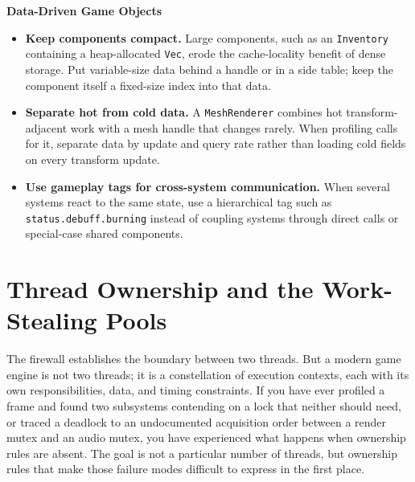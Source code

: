 \documentclass[
  11pt,
  letterpaper,
  DIV=11,
  numbers=noendperiod,
  twoside,
  open=right]{scrreprt}
\providecommand{\tightlist}{%
  \setlength{\itemsep}{0pt}\setlength{\parskip}{0pt}}
\begin{document}
\begin{tcolorbox}[enhanced jigsaw, arc=.35mm, bottomrule=.15mm, breakable, colback=white, colframe=quarto-callout-tip-color-frame, left=2mm, leftrule=.75mm, opacityback=0, rightrule=.15mm, toprule=.15mm]
\begin{minipage}[t]{5.5mm}
\textcolor{quarto-callout-tip-color}{\faLightbulb}
\end{minipage}%
\begin{minipage}[t]{\textwidth - 5.5mm}

\vspace{-3mm}\textbf{Data-Driven Game Objects}\vspace{3mm}

\begin{itemize}
\tightlist
\item
  \textbf{Keep components compact.} Large components, such as an
  \texttt{Inventory} containing a heap-allocated \texttt{Vec}, erode the
  cache-locality benefit of dense storage. Put variable-size data behind
  a handle or in a side table; keep the component itself a fixed-size
  index into that data.
\item
  \textbf{Separate hot from cold data.} A \texttt{MeshRenderer} combines
  hot transform-adjacent work with a mesh handle that changes rarely.
  When profiling calls for it, separate data by update and query rate
  rather than loading cold fields on every transform update.
\item
  \textbf{Use gameplay tags for cross-system communication.} When
  several systems react to the same state, use a hierarchical tag such
  as \texttt{status.debuff.burning} instead of coupling systems through
  direct calls or special-case shared components.
\end{itemize}

\end{minipage}%
\end{tcolorbox}

\section{Thread Ownership and the Work-Stealing
Pools}\label{thread-ownership-and-the-work-stealing-pools}

The firewall establishes the boundary between two threads. But a modern
game engine is not two threads; it is a constellation of execution
contexts, each with its own responsibilities, data, and timing
constraints. If you have ever profiled a frame and found two subsystems
contending on a lock that neither should need, or traced a deadlock to
an undocumented acquisition order between a render mutex and an audio
mutex, you have experienced what happens when ownership rules are
absent. The goal is not a particular number of threads, but ownership
rules that make those failure modes difficult to express in the first
place.
\end{document}
